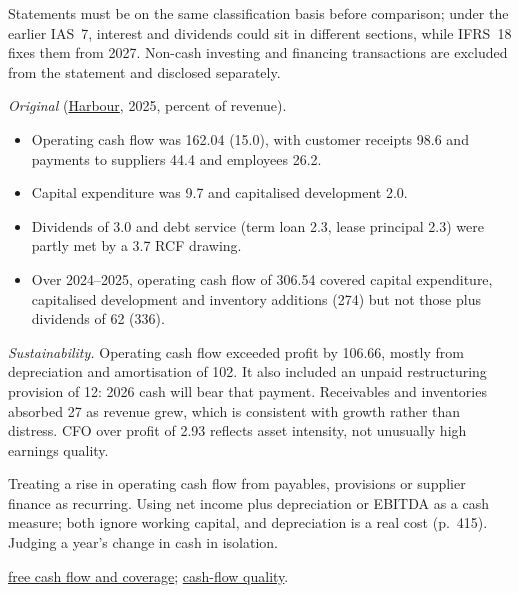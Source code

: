 \begin{qfmethod}
 Statements must be on the same classification basis before comparison; under the earlier IAS~7, interest and dividends could sit in different sections, while IFRS~18 fixes them from 2027. Non-cash investing and financing transactions are excluded from the statement and disclosed separately.

 \emph{Original} (\hyperref[ex:harbour-tools-statements]{Harbour}, 2025, percent of revenue).
\begin{itemize}
\item Operating cash flow was 162.04 (15.0), with customer receipts 98.6 and payments to suppliers 44.4 and employees 26.2.
\item Capital expenditure was 9.7 and capitalised development 2.0.
\item Dividends of 3.0 and debt service (term loan 2.3, lease principal 2.3) were partly met by a 3.7 RCF drawing.
\item Over 2024--2025, operating cash flow of 306.54 covered capital expenditure, capitalised development and inventory additions (274) but not those plus dividends of 62 (336).
\end{itemize}

\emph{Sustainability.} Operating cash flow exceeded profit by 106.66, mostly from depreciation and amortisation of 102. It also included an unpaid restructuring provision of 12: 2026 cash will bear that payment. Receivables and inventories absorbed 27 as revenue grew, which is consistent with growth rather than distress. CFO over profit of 2.93 reflects asset intensity, not unusually high earnings quality.

 Treating a rise in operating cash flow from payables, provisions or supplier finance as recurring. Using net income plus depreciation or EBITDA as a cash measure; both ignore working capital, and depreciation is a real cost (p.~415). Judging a year's change in cash in isolation.

 \hyperref[meth:free-cash-flow-coverage]{free cash flow and coverage}; \hyperref[meth:cash-flow-balance-sheet-quality]{cash-flow quality}.

\end{qfmethod}

